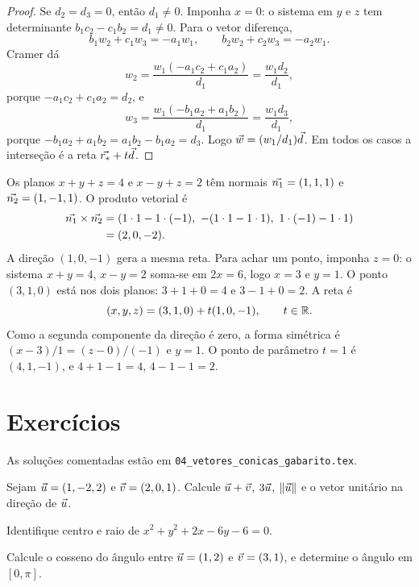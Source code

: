 \documentclass[11pt,a4paper]{article}
\begin{document}
\begin{proof}
Se $d_2=d_3=0$, então $d_1\neq 0$. Imponha $x=0$: o sistema em $y$ e $z$ tem determinante $b_1c_2-c_1b_2=d_1\neq 0$. Para o vetor diferença,
\[
b_1w_2+c_1w_3=-a_1w_1,\qquad b_2w_2+c_2w_3=-a_2w_1.
\]
Cramer dá
\[
w_2=\frac{w_1(-a_1c_2+c_1a_2)}{d_1}=\frac{w_1 d_2}{d_1},
\]
porque $-a_1c_2+c_1a_2=d_2$, e
\[
w_3=\frac{w_1(-b_1a_2+a_1b_2)}{d_1}=\frac{w_1 d_3}{d_1},
\]
porque $-b_1a_2+a_1b_2=a_1b_2-b_1a_2=d_3$. Logo $\vec{w}=(w_1/d_1)\vec{d}$. Em todos os casos a interseção é a reta $\vec{r_*}+t\vec{d}$.
\end{proof}

\begin{exemplo}
Os planos $x+y+z=4$ e $x-y+z=2$ têm normais $\vec{n_1}=(1,1,1)$ e $\vec{n_2}=(1,-1,1)$. O produto vetorial é
\begin{align*}
\vec{n_1}\times\vec{n_2}
&=(1\cdot 1-1\cdot(-1),\ -(1\cdot 1-1\cdot 1),\ 1\cdot(-1)-1\cdot 1)\\
&=(2,0,-2).
\end{align*}
A direção $(1,0,-1)$ gera a mesma reta. Para achar um ponto, imponha $z=0$: o sistema $x+y=4$, $x-y=2$ soma-se em $2x=6$, logo $x=3$ e $y=1$. O ponto $(3,1,0)$ está nos dois planos: $3+1+0=4$ e $3-1+0=2$. A reta é
\[
(x,y,z)=(3,1,0)+t(1,0,-1),\qquad t\in\mathbb{R}.
\]
Como a segunda componente da direção é zero, a forma simétrica é $(x-3)/1=(z-0)/(-1)$ e $y=1$. O ponto de parâmetro $t=1$ é $(4,1,-1)$, e $4+1-1=4$, $4-1-1=2$.
\end{exemplo}

\section{Exercícios}

As soluções comentadas estão em \texttt{04\_vetores\_conicas\_gabarito.tex}.

\begin{exercicio}
Sejam $\vec{u}=(1,-2,2)$ e $\vec{v}=(2,0,1)$. Calcule $\vec{u}+\vec{v}$, $3\vec{u}$, $\left\lVert \vec{u} \right\rVert$ e o vetor unitário na direção de $\vec{u}$.
\end{exercicio}

\begin{exercicio}
Identifique centro e raio de $x^2+y^2+2x-6y-6=0$.
\end{exercicio}

\begin{exercicio}
Calcule o cosseno do ângulo entre $\vec{u}=(1,2)$ e $\vec{v}=(3,1)$, e determine o ângulo em $[0,\pi]$.
\end{exercicio}
\end{document}
